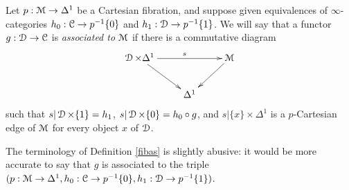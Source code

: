\begin{definition}\label{fibas}
Let $p: \operatorname{\mathcal{M}} \rightarrow \Delta^1$ be a Cartesian fibration, and suppose given
equivalences of $\infty$-categories $h_0: \operatorname{\mathcal{C}} \rightarrow p^{-1} \{0\}$ and $h_1: \operatorname{\mathcal{D}} \rightarrow p^{-1} \{1\}$. We will say that a functor $g: \operatorname{\mathcal{D}} \rightarrow \operatorname{\mathcal{C}}$ is {\it associated to $\operatorname{\mathcal{M}}$} if
there is a commutative diagram
$$ \xymatrix{ \calD \times \Delta^1 \ar[dr] \ar[rr]^{s} & & \calM \ar[dl] \\
& \Delta^1 & }$$
such that $s| \operatorname{\mathcal{D}} \times \{1\} = h_1$, $s| \operatorname{\mathcal{D}} \times \{0\} = h_0 \circ g$, and
$s| \{x\} \times \Delta^1$ is a $p$-Cartesian edge of $\operatorname{\mathcal{M}}$ for every object $x$ of $\operatorname{\mathcal{D}}$.
\end{definition}

\begin{remark}
The terminology of Definition \ref{fibas} is slightly abusive: it would be more accurate to say that $g$ is associated to the triple $(p: \operatorname{\mathcal{M}} \rightarrow \Delta^1, h_0: \operatorname{\mathcal{C}} \rightarrow p^{-1} \{0\},
h_1: \operatorname{\mathcal{D}} \rightarrow p^{-1} \{1\} )$. 
\end{remark}

